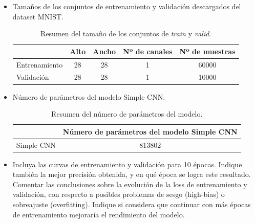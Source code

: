 \documentclass[12pt]{scrartcl}
\begin{document}
\begin{itemize}
    \item Tamaños de los conjuntos de entrenamiento y validación descargados del dataset MNIST.
    \begin{table}[H]
        \centering
        \begin{tabular}{l c|c|c|c}
            \multicolumn{1}{c}{}                & \cellcolor[HTML]{E3E7EC}Alto & \cellcolor[HTML]{E3E7EC}Ancho & \cellcolor[HTML]{E3E7EC}Nº de canales & \cellcolor[HTML]{E3E7EC}Nº de muestras \\ \hline
            \cellcolor[HTML]{E3E7EC}Entrenamiento & 28                                        & 28                                         & 1                                               & 60000                                  \\
            \cellcolor[HTML]{E3E7EC}Validación    & 28                                        & 28                                         & 1                                               & 10000                                  \\ 
        \end{tabular}
        \caption{Resumen del tamaño de los conjuntos de \emph{train} y \emph{valid}.}
        \label{table:res1}
    \end{table}
    \item Número de parámetros del modelo Simple CNN.
    \begin{table}[H]
        \centering
        \begin{tabular}{l c}
            \multicolumn{1}{c}{}             & \cellcolor[HTML]{E3E7EC}Número de parámetros del modelo Simple CNN \\ \hline
            \cellcolor[HTML]{E3E7EC}Simple CNN & 813802                                                             \\
        \end{tabular}
        \caption{Resumen del número de parámetros del modelo.}
        \label{table:res1}
    \end{table}
    \item Incluya las curvas de entrenamiento y validación para 10 épocas. Indique también la mejor precisión obtenida, y en qué época se logra este resultado. Comentar las conclusiones sobre la evolución de la loss de entrenamiento y validación, con respecto a posibles problemas de sesgo (high-bias) o sobreajuste (overfitting). Indique si considera que continuar con más épocas de entrenamiento mejoraría el rendimiento del modelo.

\end{itemize}
\end{document}
